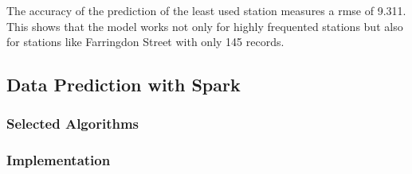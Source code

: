 The accuracy of the prediction of the least used station measures a \acs{rmse} of 9.311. This shows that the model works not only for highly frequented stations but also for stations like Farringdon Street with only 145 records.
\subsection{Data Prediction with Spark}\label{sec:spark}
\subsubsection{Selected Algorithms}\label{sec:sparkalgos}
\subsubsection{Implementation}\label{sec:sparkimpl}

